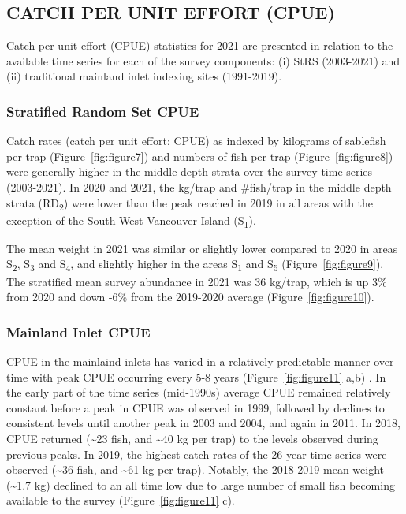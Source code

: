 \documentclass[12pt]{article}\usepackage[]{graphicx}\usepackage[]{color}
\begin{document}
\hypertarget{catch-per-unit-effort-cpue}{%
\subsection{CATCH PER UNIT EFFORT (CPUE)}\label{catch-per-unit-effort-cpue}}

Catch per unit effort (CPUE) statistics for 2021 are presented in relation to the available time series for each of the survey components: (i) StRS (2003-2021) and (ii) traditional mainland inlet indexing sites (1991-2019).

\hypertarget{stratified-random-set-cpue}{%
\subsubsection{Stratified Random Set CPUE}\label{stratified-random-set-cpue}}

Catch rates (catch per unit effort; CPUE) as indexed by kilograms of sablefish per trap (Figure~\ref{fig:figure7}) and numbers of fish per trap (Figure~\ref{fig:figure8}) were generally higher in the middle depth strata over the survey time series (2003-2021). In 2020 and 2021, the kg/trap and \#fish/trap in the middle depth strata (RD\textsubscript{2}) were lower than the peak reached in 2019 in all areas with the exception of the South West Vancouver Island (S\textsubscript{1}).

The mean weight in 2021 was similar or slightly lower compared to 2020 in areas S\textsubscript{2}, S\textsubscript{3} and S\textsubscript{4}, and slightly higher in the areas S\textsubscript{1} and S\textsubscript{5} (Figure~\ref{fig:figure9}). The stratified mean survey abundance in 2021 was 36 kg/trap, which is up 3\% from 2020 and down -6\% from the 2019-2020 average (Figure~\ref{fig:figure10}).

\hypertarget{mainland-inlet-cpue}{%
\subsubsection{Mainland Inlet CPUE}\label{mainland-inlet-cpue}}

CPUE in the mainlaind inlets has varied in a relatively predictable manner over time with peak CPUE occurring every 5-8 years (Figure~\ref{fig:figure11} a,b) . In the early part of the time series (mid-1990s) average CPUE remained relatively constant before a peak in CPUE was observed in 1999, followed by declines to consistent levels until another peak in 2003 and 2004, and again in 2011. In 2018, CPUE returned (\textasciitilde23 fish, and \textasciitilde40 kg per trap) to the levels observed during previous peaks. In 2019, the highest catch rates of the 26 year time series were observed (\textasciitilde36 fish, and \textasciitilde61 kg per trap). Notably, the 2018-2019 mean weight (\textasciitilde1.7 kg) declined to an all time low due to large number of small fish becoming available to the survey (Figure~\ref{fig:figure11} c).
\end{document}
